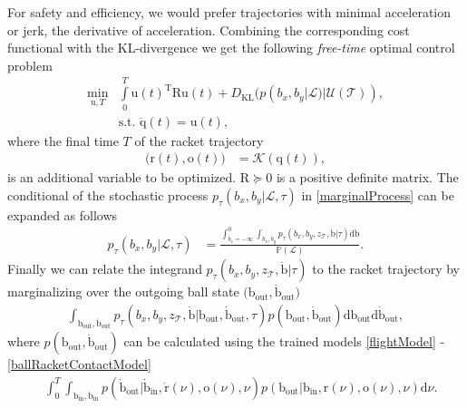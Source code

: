 \documentclass[letterpaper, 10 pt, conference]{ieeeconf}
\newcommand{\boldvec}[1]{\boldsymbol{\mathrm{#1}}}
\let\vec\boldvec
\newcommand{\kin}{\mathcal{K}} %
\newcommand{\joint}{\vec{q}} %
\newcommand{\sysInput}{\vec{u}} %
\newcommand{\ball}{\vec{b}} %
\newcommand{\racket}{\vec{r}} %
\newcommand{\orient}{\vec{o}} %
\newcommand{\court}{\mathcal{T}} %
\newcommand{\prob}{\mathbb{P}} %
\newcommand{\landTime}{\tau} %
\newcommand{\landEvent}{\mathcal{L}} %
\newcommand{\hitTime}{\nu} %
\newcommand{\hitDist}{p(\nu)} %
\newcommand{\KL}{D_{\mathrm{KL}}}
\begin{document}
For safety and efficiency, we would prefer trajectories with minimal acceleration or jerk, the derivative of acceleration. Combining the corresponding cost functional with the KL-divergence we get the following \emph{free-time} optimal control problem
%
\begin{align}
\min_{\sysInput,T} & \int\limits_{0}^{T}\sysInput(t)^{\mathrm{T}}\vec{R}\sysInput(t) + \KL(p(b_x,b_y|\landEvent)|\mathcal{U}(\court)), \\
& \textrm{s.t. } \ddot{\joint}(t) = \sysInput(t),
\label{costFnc1}
\end{align}
%
\noindent where the final time $T$ of the racket trajectory 
%
\begin{align}
\big(\racket(t),\orient(t)\big) &= \kin(\joint(t)),
\end{align}
%
\noindent is an additional variable to be optimized. $\vec{R} \succeq 0$ is a positive definite matrix. The conditional of the stochastic process $p_{\landTime}(b_x,b_y|\landEvent,\landTime)$ in \eqref{marginalProcess} can be expanded as follows
%
\begin{align}
p_{\landTime}(b_x,b_y|\landEvent,\landTime) &= \frac{ \int_{\dot{b}_z=-\infty}^{0}\int_{\dot{b}_x,\dot{b}_y}p_{\landTime}(b_x,b_y,z_{\court},\dot{\ball}|\landTime)\mathrm{d}\dot{\ball}}{\prob(\landEvent)}.
\label{marginalDistr2}
\end{align}
%
\noindent Finally we can relate the integrand $p_{\landTime}(b_x,b_y,z_{\court},\dot{\ball}|\landTime)$ to the racket trajectory by marginalizing over the outgoing ball state $\big(\ball_{\textrm{out}},\dot{\ball}_{\textrm{out}})$
%
\begin{align}
\int_{\ball_{\textrm{out}},\dot{\ball}_{\textrm{out}}}  p_{\landTime}(b_x,b_y,z_{\court},\dot{\ball}|\ball_{\textrm{out}},\dot{\ball}_{\textrm{out}},\landTime) p(\ball_{\textrm{out}},\dot{\ball}_{\textrm{out}})\textrm{d}\ball_{\textrm{out}}\textrm{d}\dot{\ball}_{\textrm{out}},
\label{fullDistrMarginal1}
\end{align}
%
\noindent where $p(\ball_{\textrm{out}},\dot{\ball}_{\textrm{out}})$ can be calculated using the trained models \eqref{flightModel} - \eqref{ballRacketContactModel}
%
\begin{align}
&\int_{0}^{T}\!\int_{\ball_{\textrm{in}},\dot{\ball}_{\textrm{in}}}\!p(\dot{\ball}_{\textrm{out}}|\dot{\ball}_{\textrm{in}},\dot{\racket}(\hitTime),\orient(\hitTime),\hitTime) p(\ball_{\textrm{out}}|\ball_{\textrm{in}},\racket(\hitTime),\orient(\hitTime),\hitTime)\textrm{d}\hitTime. %
\label{fullDistrMarginal2}
\end{align}
\end{document}
